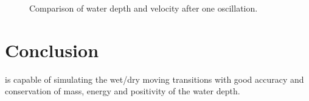 \begin{figure}[H]
\begin{minipage}[t]{0.5\textwidth}
 \centering
\end{minipage}%
\begin{minipage}[t]{0.5\textwidth}
 \centering
\end{minipage}
  \caption{Comparison of water depth and velocity after one oscillation.}
  \label{fig:thacker2:SLU_comparison2}
\end{figure}

\section{Conclusion}
 is capable of simulating the wet/dry moving transitions with good
accuracy and conservation of mass, energy and positivity of the water depth.



